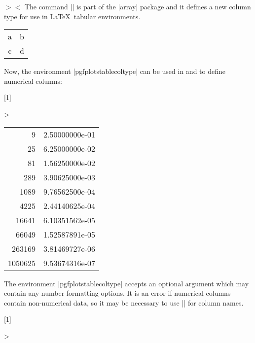 \begin{command}{\newcolumntype{}$>$$<$}
The command |\newcolumntype| is part of the |array| package and it defines a new column type  for use in \LaTeX\ tabular environments.
\begin{codeexample}
\usepackage{array}
\end{codeexample}

\begin{codeexample}[]
\begin{tabular}{dl}
a & b \\
c & d \\
\end{tabular}
\end{codeexample}

Now, the environment |pgfplotstablecoltype| can be used in  and  to define numerical columns:
\begin{codeexample}[]
\newcolumntype{L}[1]
	{>{\begin{pgfplotstablecoltype}[#1]}r<{\end{pgfplotstablecoltype}}}

\begin{tabular}{L{int detect}L{sci,sci subscript,sci zerofill}}
9      & 2.50000000e-01\\
25     & 6.25000000e-02\\
81     & 1.56250000e-02\\
289    & 3.90625000e-03\\
1089   & 9.76562500e-04\\
4225   & 2.44140625e-04\\
16641  & 6.10351562e-05\\
66049  & 1.52587891e-05\\
263169 & 3.81469727e-06\\
1050625& 9.53674316e-07\\
\end{tabular}
\end{codeexample}
\noindent The environment |pgfplotstablecoltype| accepts an optional argument which may contain any number formatting options. It is an error if numerical columns contain non-numerical data, so it may be necessary to use |\multicolumn| for column names.

\begin{codeexample}[]
\newcolumntype{L}[1]
	{>{\begin{pgfplotstablecoltype}[#1]}r<{\end{pgfplotstablecoltype}}}


\end{codeexample}
\end{command}
